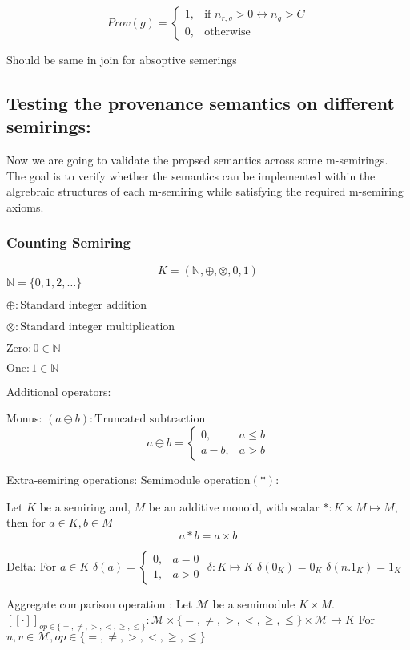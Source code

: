 \documentclass[twocolumn]{article}
\begin{document}
$$Prov(g) = \begin{cases}
   1, & \text{if } n_{r, g} > 0 \leftrightarrow n_g > C \\
   0, & \text{otherwise}
   \end{cases}$$

Should be same in join for absoptive semerings

\subsection{Testing the provenance semantics on different semirings:}
Now we are going to validate the propsed semantics across some m-semirings. The goal is to 
verify whether the semantics can be implemented within the algrebraic structures of each m-semiring 
while satisfying the required m-semiring axioms.
\subsubsection{Counting Semiring}
$$K = (\mathbb{N}, \oplus, \otimes, 0, 1)$$
$\mathbb{N} = \{0,1,2,\dots\}$

$\oplus : \text{Standard integer addition}$

$\otimes : \text{Standard integer multiplication}$

$\text{Zero} : 0 \in \mathbb{N}$

$\text{One} : 1 \in \mathbb{N}$

Additional operators:

Monus: $(a \ominus b): \text{Truncated subtraction}$
$$ a \ominus b = \begin{cases} 0, &  a\leq b\\ a-b,& a>b \end{cases}$$

Extra-semiring operations:
Semimodule operation$(*)$:

Let $K$ be a semiring and, $M$ be an additive monoid, with scalar $*:K\times M \mapsto M$, then for $a \in K, b \in M$
$$a * b = a \times b$$


Delta: 
For $a \in K$
$\delta(a) = \begin{cases} 0, & a=0\\ 1, & a>0 \end{cases}$
$\delta:K \mapsto K $
$\delta(0_K)=0_K$
$\delta(n.1_K)=1_K$

Aggregate comparison operation : \newline
Let $\mathcal{M}$ be a semimodule $K\times M$.
$[[\cdot]]_{\mathit{op}\in\{ =, \neq , >, <, \geq, \leq\}}: \mathcal{M} \times \{ =, \neq , >, <, \geq, \leq\} \times \mathcal{M} \rightarrow K$
For $u,v\in \mathcal{M}, op \in \{ =, \neq , >, <, \geq, \leq\}$
\end{document}
